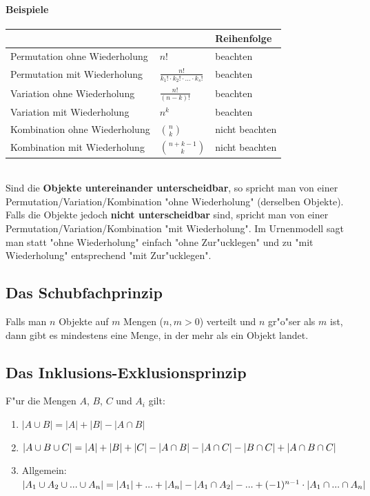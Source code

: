 \documentclass[10pt,a4paper,landscape]{article}
\begin{document}
\begin{multicols*}{3}
		\paragraph{Beispiele}
		\noindent\begin{tabular}{p{2.65cm} | p{2.65cm} | p{2.2cm}}
			& & Reihenfolge    \\
			\hline
			Permutation ohne Wiederholung & $n!$ & beachten       \\
			\hline
			Permutation mit Wiederholung  & $\frac{n!}{k_1! \cdot  k_2! \cdot \text{...} \cdot k_s!}$ & beachten       \\
			\hline
			Variation ohne Wiederholung   & $\frac{n!}{(n-k)!}$ & beachten       \\
			\hline
			Variation mit Wiederholung    & $n^k$ & beachten       \\
			\hline
			Kombination ohne Wiederholung & ${n \choose k}$ & nicht beachten \\
			\hline
			Kombination mit Wiederholung  & ${n+k-1 \choose k}$ & nicht beachten \\
		\end{tabular}
		\\
		
		Sind die \textbf{Objekte untereinander unterscheidbar}, so spricht man von einer Permutation/Variation/Kombination "ohne Wiederholung" (derselben Objekte). Falls die Objekte jedoch \textbf{nicht unterscheidbar} sind, spricht man von einer Permutation/Variation/Kombination "mit Wiederholung". Im Urnenmodell sagt man statt "ohne Wiederholung" einfach "ohne Zur"ucklegen" und zu "mit Wiederholung" entsprechend "mit Zur"ucklegen".
		
		\subsection{Das Schubfachprinzip}
		Falls man $n$ Objekte auf $m$ Mengen ($n, m > 0$) verteilt und $n$ gr"o"ser als $m$ ist, dann gibt es mindestens eine Menge, in der mehr als ein Objekt landet.
		
		\subsection{Das Inklusions-Exklusionsprinzip}
		F"ur die Mengen $A$, $B$, $C$ und $A_i$ gilt:
		\begin{enumerate}
			\item $| A \cup B | = |A| + |B| - |A \cap B |$
			\item $| A \cup B \cup C | = |A| + |B| + |C| - |A \cap B | - |A \cap C |\\- |B \cap C | + |A \cap B \cap C | $
			\item Allgemein: $| A_1 \cup A_2 \cup ... \cup A_n | = |A_1| + ... + |A_n|\\-  |A_1 \cap A_2 | - ... + (-1)^{n-1} \cdot  |A_1 \cap ... \cap A_n | $
		\end{enumerate}


\end{multicols*}
\end{document}
